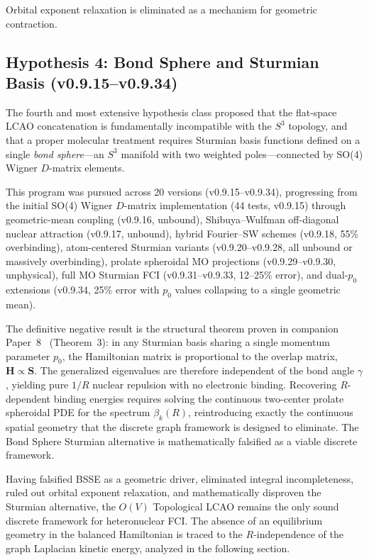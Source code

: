 \documentclass[aps,pra,twocolumn,superscriptaddress,longbibliography]{revtex4-2}
\begin{document}
Orbital exponent relaxation is eliminated as a mechanism for geometric
contraction.

\subsection{Hypothesis 4: Bond Sphere and Sturmian Basis
(v0.9.15--v0.9.34)}
\label{sec:hyp_sturmian}

The fourth and most extensive hypothesis class proposed that the
flat-space LCAO concatenation is fundamentally incompatible with the
$S^3$ topology, and that a proper molecular treatment requires Sturmian
basis functions defined on a single \emph{bond sphere}---an $S^3$
manifold with two weighted poles---connected by SO(4) Wigner $D$-matrix
elements.

This program was pursued across 20 versions (v0.9.15--v0.9.34),
progressing from the initial SO(4) Wigner $D$-matrix implementation (44
tests, v0.9.15) through geometric-mean coupling (v0.9.16, unbound),
Shibuya--Wulfman off-diagonal nuclear attraction (v0.9.17, unbound),
hybrid Fourier--SW schemes (v0.9.18, 55\% overbinding), atom-centered
Sturmian variants (v0.9.20--v0.9.28, all unbound or massively
overbinding), prolate spheroidal MO projections
(v0.9.29--v0.9.30, unphysical), full MO Sturmian FCI
(v0.9.31--v0.9.33, 12--25\% error), and dual-$p_0$ extensions (v0.9.34,
25\% error with $p_0$ values collapsing to a single geometric mean).

The definitive negative result is the structural theorem proven in
companion Paper~8~\cite{paper8} (Theorem~3): in any Sturmian basis
sharing a single momentum parameter $p_0$, the Hamiltonian matrix is
proportional to the overlap matrix,
$\mathbf{H} \propto \mathbf{S}$.  The generalized eigenvalues are
therefore independent of the bond angle $\gamma$, yielding pure $1/R$
nuclear repulsion with no electronic binding.  Recovering
$R$-dependent binding energies requires solving the continuous
two-center prolate spheroidal PDE for the spectrum $\beta_k(R)$,
reintroducing exactly the continuous spatial geometry that the discrete
graph framework is designed to eliminate.  The Bond Sphere Sturmian
alternative is mathematically falsified as a viable discrete framework.

\medskip

Having falsified BSSE as a geometric driver, eliminated integral
incompleteness, ruled out orbital exponent relaxation, and
mathematically disproven the Sturmian alternative, the $O(V)$
Topological LCAO remains the only sound discrete framework for
heteronuclear FCI.  The absence of an equilibrium geometry in the
balanced Hamiltonian is traced to the $R$-independence of the graph
Laplacian kinetic energy, analyzed in the following section.
\end{document}
